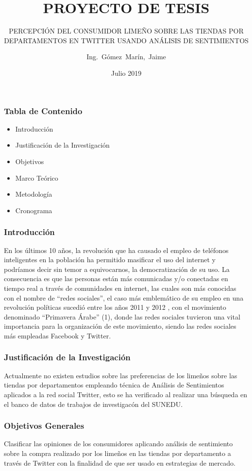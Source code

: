 \documentclass{beamer}
\title[Proyecto de Tesis ] %
{PROYECTO DE TESIS}
\subtitle{PERCEPCI\'ON DEL CONSUMIDOR LIME\~NO SOBRE LAS TIENDAS POR DEPARTAMENTOS EN  TWITTER USANDO AN\'ALISIS DE SENTIMIENTOS}
\author[JGM] %
{Ing.~Gómez~Marín,~Jaime}
\institute[UNALM] %
{  
}
\date{Julio 2019}
\begin{document}
\begin{frame}
\titlepage
\end{frame}

\begin{frame}
\frametitle{Tabla de Contenido}
\begin{itemize}
\item Introducci\'on
\item Justificaci\'on de la Investigaci\'on
\item Objetivos
\item Marco Te\'orico
\item Metodolog\'ia
\item Cronograma
\end{itemize}
\end{frame}

\begin{frame}
\frametitle{Introducci\'on}
En los últimos 10 años, la revolución que ha causado el empleo de teléfonos inteligentes en la población 
ha permitido masificar el uso del internet y podríamos decir sin temor a equivocarnos, la democratización de su uso.
 La consecuencia es que las personas están más comunicadas y/o conectadas en tiempo real a través  de comunidades 
 en internet, las cuales son más conocidas con el nombre de “redes sociales”, el caso más emblemático de su empleo 
 en una revolución políticas sucedió entre los años 2011 y 2012 , con el movimiento denominado  “Primavera Árabe” (1), 
 donde las redes sociales tuvieron una vital importancia para la organización de este movimiento, siendo las redes 
 sociales más empleadas Facebook y Twitter. \\
\end{frame}

%
\begin{frame}
\frametitle{Justificaci\'on de la Investigaci\'on}
Actualmente no existen estudios sobre las preferencias  de los lime\~nos sobre las tiendas por departamentos empleando técnica de Análisis de Sentimientos aplicados a la red social Twitter, esto se ha verificado al realizar una b\'usqueda en el banco de datos de trabajos de investigac\'on del SUNEDU. \\

\end{frame}



%
\begin{frame}
\frametitle{Objetivos Generales}
Clasificar las opiniones de los consumidores aplicando análisis de sentimiento sobre la compra realizado por los limeños en las tiendas por departamento a través de Twitter con la finalidad de que ser usado en estrategias de mercado. 
\end{frame}
\end{document}
